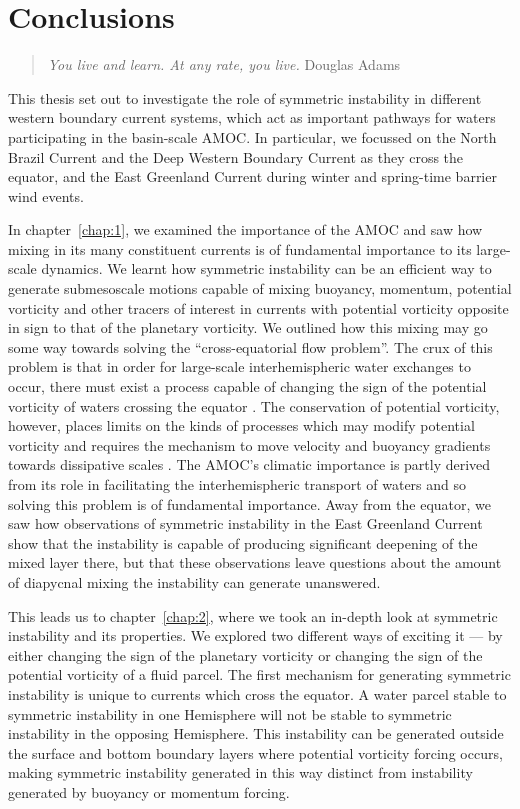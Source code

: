 \chapter{Conclusions}
\label{chap:Conclusions}
\begin{quote}
    \textit{You live and learn. At any rate, you live.}
    \newline Douglas Adams
\end{quote}
This thesis set out to investigate the role of symmetric instability in different western boundary current systems, which act as important pathways for waters participating in the basin-scale AMOC. In particular, we focussed on the North Brazil Current and the Deep Western Boundary Current as they cross the equator, and the East Greenland Current during winter and spring-time barrier wind events.

In chapter~\ref{chap:1}, we examined the importance of the AMOC and saw how mixing in its many constituent currents is of fundamental importance to its large-scale dynamics. We learnt how symmetric instability can be an efficient way to generate submesoscale motions capable of mixing buoyancy, momentum, potential vorticity and other tracers of interest in currents with potential vorticity opposite in sign to that of the planetary vorticity. We outlined how this mixing may go some way towards solving the ``cross-equatorial flow problem''. The crux of this problem is that in order for large-scale interhemispheric water exchanges to occur, there must exist a process capable of changing the sign of the potential vorticity of waters crossing the equator \citep{Csanady1985, Nof1990, Killworth1991}. The conservation of potential vorticity, however, places limits on the kinds of processes which may modify potential vorticity and requires the mechanism to move velocity and buoyancy gradients towards dissipative scales \citep{Haynes1987}. The AMOC's climatic importance is partly derived from its role in facilitating the interhemispheric transport of waters and so solving this problem is of fundamental importance. Away from the equator, we saw how observations of symmetric instability in the East Greenland Current show that the instability is capable of producing significant deepening of the mixed layer there, but that these observations leave questions about the amount of diapycnal mixing the instability can generate unanswered.

This leads us to chapter~\ref{chap:2}, where we took an in-depth look at symmetric instability and its properties. We explored two different ways of exciting it --- by either changing the sign of the planetary vorticity or changing the sign of the potential vorticity of a fluid parcel. The first mechanism for generating symmetric instability is unique to currents which cross the equator. A water parcel stable to symmetric instability in one Hemisphere will not be stable to symmetric instability in the opposing Hemisphere. This instability can be generated outside the surface and bottom boundary layers where potential vorticity forcing occurs, making symmetric instability generated in this way distinct from instability generated by buoyancy or momentum forcing.

